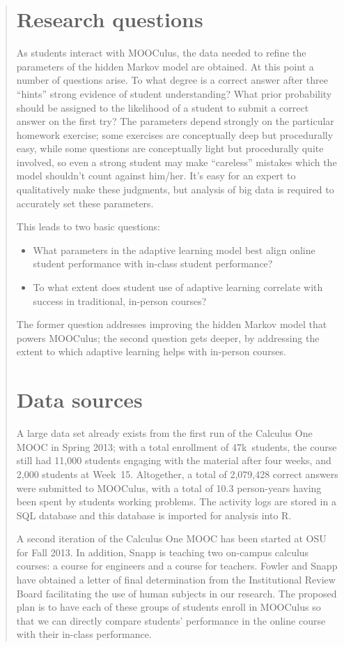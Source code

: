 \documentclass[12pt]{article}
\begin{document}
\begin{quote}
\section{Research questions}

As students interact with MOOCulus, the data needed to refine the
parameters of the hidden Markov model are obtained.  At this point a
number of questions arise. To what degree is a correct answer after
three ``hints'' strong evidence of student understanding?  What prior
probability should be assigned to the likelihood of a student to
submit a correct answer on the first try?  The parameters depend
strongly on the particular homework exercise; some exercises are
conceptually deep but procedurally easy, while some questions are
conceptually light but procedurally quite involved, so even a strong
student may make ``careless'' mistakes which the model shouldn't count
against him/her.  It's easy for an expert to qualitatively make these
judgments, but analysis of big data is required to accurately set
these parameters.

This leads to two basic questions:
\begin{itemize}
\item What parameters in the adaptive
  learning model best align online student performance with in-class
  student performance?
\item To what extent does student use
  of adaptive learning correlate with success in traditional,
  in-person courses?
\end{itemize}
The former question addresses improving the hidden Markov model that
powers MOOCulus; the second question gets deeper, by addressing the
extent to which adaptive learning helps with in-person courses.

\section{Data sources}

A large data set already exists from the first run of the Calculus One
MOOC in Spring 2013; with a total enrollment of 47k~students, the
course still had 11,000 students engaging with the material after four
weeks, and 2,000 students at Week~15.  Altogether, a total of
2,079,428 correct answers were submitted to MOOCulus, with a total of
10.3 person-years having been spent by students working problems.  The
activity logs are stored in a SQL database and this database is
imported for analysis into R.

A second iteration of the Calculus One MOOC has been started at OSU
for Fall 2013.  In addition, Snapp is teaching two on-campus calculus
courses: a course for engineers and a course for teachers.  Fowler and
Snapp have obtained a letter of final determination from the
Institutional Review Board facilitating the use of human subjects in
our research.  The proposed plan is to have each of these groups of
students enroll in MOOCulus so that we can directly compare students'
performance in the online course with their in-class performance.



\end{quote}
\end{document}
